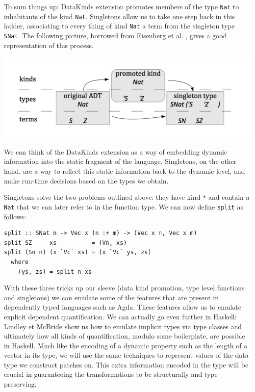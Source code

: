 \documentclass[11pt, titlepage]{article}
\begin{document}
To sum things up:
DataKinds extension promotes members of the type \texttt{Nat} to inhabitants of the kind \texttt{Nat}. Singletons allow us to take one step back in this ladder, associating to every thing of kind \texttt{Nat} a term from
the singleton type \texttt{SNat}. The following picture, borrowed from Eisenberg et al. \cite{singletons}, gives a good representation of this process.

\includegraphics[width=\textwidth]{singleton.png}\label{singletonImg}

We can think of the DataKinds extension as a way of embedding dynamic information into the static fragment of the language. Singletons, on the other hand, are a way to reflect this static information back to the dynamic level, and make run-time decisions based on the types we obtain.

Singletons solve the two problems outlined above: they have kind \texttt{*} and contain a \texttt{Nat} that we can later refer to in the function type. We can now define \texttt{split} as follows:

\begin{verbatim}
split :: SNat n -> Vec x (n :+ m) -> (Vec x n, Vec x m)
split SZ     xs          = (Vn, xs)
split (Sn n) (x `Vc` xs) = (x `Vc` ys, zs)
  where
    (ys, zs) = split n xs
\end{verbatim}

With these three tricks up our sleeve (data kind promotion, type level functions and singletons) we can emulate some of the features that are present in dependently typed languages such as Agda. These features allow us to emulate explicit dependent quantification. We can actually go even further in Haskell: Lindley et McBride \cite{hasochism} show us how to emulate implicit types via type classes and ultimately how all kinds of quantification, modulo some boilerplate, are possible in Haskell.
Much like the encoding of a dynamic property such as the length of a vector in its type, we will use the same techniques to represent values of the data type we construct patches on. This extra information encoded in the type will be crucial in guaranteeing the transformations to be structurally and type preserving.
\end{document}

